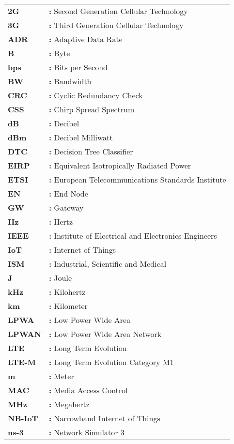 \hspace{-3mm}
\begin{tabular}{p{2cm}l}
{\bf 2G} & {\bf:} Second Generation Cellular Technology\\
{\bf 3G} & {\bf:} Third Generation Cellular Technology\\
{\bf ADR} & {\bf:} Adaptive Data Rate\\
{\bf B} & {\bf:} Byte\\
{\bf bps} & {\bf:} Bits per Second\\
{\bf BW} & {\bf:} Bandwidth\\
{\bf CRC} & {\bf:} Cyclic Redundancy Check\\
{\bf CSS} & {\bf:} Chirp Spread Spectrum\\
{\bf dB} & {\bf:} Decibel\\
{\bf dBm} & {\bf:} Decibel Milliwatt\\
{\bf DTC} & {\bf:} Decision Tree Classifier\\
{\bf EIRP} & {\bf:} Equivalent Isotropically Radiated Power\\
{\bf ETSI} & {\bf:} European Telecommunications Standards Institute\\
{\bf EN} & {\bf:} End Node\\
{\bf GW} & {\bf:} Gateway\\
{\bf Hz} & {\bf:} Hertz\\
{\bf IEEE} & {\bf:} Institute of Electrical and Electronics Engineers\\
{\bf IoT} & {\bf:} Internet of Things\\
{\bf ISM} & {\bf:} Industrial, Scientific and Medical\\
{\bf J} & {\bf:} Joule\\
{\bf kHz} & {\bf:} Kilohertz\\
{\bf km} & {\bf:} Kilometer\\
{\bf LPWA} & {\bf:} Low Power Wide Area\\
{\bf LPWAN} & {\bf:} Low Power Wide Area Network\\
{\bf LTE} & {\bf:} Long Term Evolution\\
{\bf LTE-M} & {\bf:}  Long Term Evolution Category M1\\
{\bf m} & {\bf:} Meter\\
{\bf MAC} & {\bf:} Media Access Control\\
{\bf MHz} & {\bf:} Megahertz\\
{\bf NB-IoT} & {\bf:} Narrowband Internet of Things\\
{\bf ns-3} & {\bf:} Network Simulator 3\\

\end{tabular}
